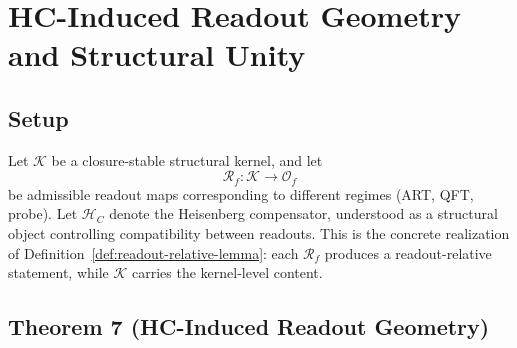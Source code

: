 \section{HC-Induced Readout Geometry and Structural Unity}
\label{sec:theorem7}

\subsection*{Setup}

Let $\mathcal{K}$ be a closure-stable structural kernel, and let
\[
  \mathcal{R}_f : \mathcal{K} \to \mathcal{O}_f
\]
be admissible readout maps corresponding to different regimes (ART,
QFT, probe). Let $\mathcal{H}_C$ denote the Heisenberg compensator,
understood as a structural object controlling compatibility between
readouts. This is the concrete realization of
Definition~\ref{def:readout-relative-lemma}: each $\mathcal{R}_f$
produces a readout-relative statement, while $\mathcal{K}$ carries the
kernel-level content.

\subsection*{Theorem 7 (HC-Induced Readout Geometry)}

